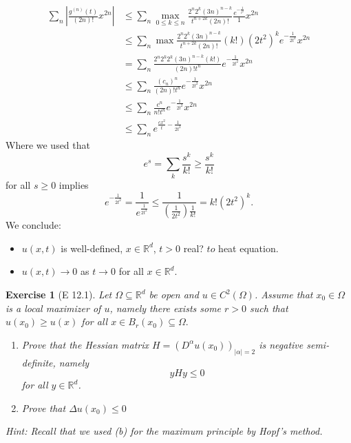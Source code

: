\documentclass{report}
\theoremstyle{tommy}
\newtheorem{ex}[defn]{Exercise}
\begin{document}
  \begin{align*}
    \sum_{n} \left|\frac{g^{(n)}(t)}{(2n)!} x^{2n}\right| &
    \le \sum_n \max_{0 \le k \le n} \frac{2^n 2^k (3n)^{n-k}}{t^{n+2k}(2n)!} \frac{e^{-\frac{1}{t^2}}}{1} x^{2n} \\
    &\le \sum_{n} \max \frac{2^n 2^k (3n)^{n-k}}{t^{n+2k}(2n)!} (k!)(2t^2)^k e^{- \frac{1}{2t^2}} x^{2n} \\
    &= \sum_{n} \frac{2^n 2^k 2^k (3n)^{n-k}(k!)}{(2n)!t^n} e^{- \frac{1}{2t^2}} x^{2n} \\
    &\le \sum_{n} \frac{(c_n)^n}{(2n)!t^n} e^{- \frac{1}{2t^2}} x^{2n}\\
    &\le \sum_{n} \frac{c^n}{n!t^n} e^{- \frac{1}{2t^2}} x^{2n} \\
    &\le \sum_{n} e^{\frac{cx^2}{t}-\frac{1}{2t^2}}
  \end{align*}
  Where we used that
  \[e^s = \sum_k \frac{s^k}{k!} \ge \frac{s^k}{k!}\]
  for all \(s \ge 0\) implies 
  \[e^{- \frac{1}{2t^2}} = \frac{1}{e^{\frac{1}{2t^2}}} \le \frac{1}{\left(\frac{1}{2t^2}\right) \frac{1}{k!}} = k!(2t^2)^k.\]
  We conclude:
  \begin{itemize}
    \item \(u(x,t)\) is well-defined, \(x \in \mathbb{R}^d\), \(t > 0\) real? \(to\) heat equation. 
    \item \(u(x,t) \to 0\) as \(t \to 0\) for all \(x \in \mathbb{R}^d\).
  \end{itemize}

  \begin{ex}[E 12.1]
    Let \(\Omega \subseteq \mathbb{R}^d\) be open and \(u \in C^2(\Omega)\). Assume that \(x_0 \in \Omega\) is a local maximizer of \(u\), namely there exists some \(r > 0\) such that 
    \(u(x_0) \ge u(x)\)
    for all \(x \in B_r(x_0) \subseteq \Omega.\)
    \begin{enumerate}[label=(\alph*)]
      \item Prove that the Hessian matrix \(H = (D^\alpha u(x_0))_{|\alpha|=2}\) is negative semi-definite, namely \[y H y \le 0\]
      for all \(y \in \mathbb{R}^d\).
      \item Prove that \(\Delta u(x_0) \le 0\)
    \end{enumerate}
    Hint: Recall that we used (b) for the maximum principle by Hopf's method.
  \end{ex}
\end{document}

